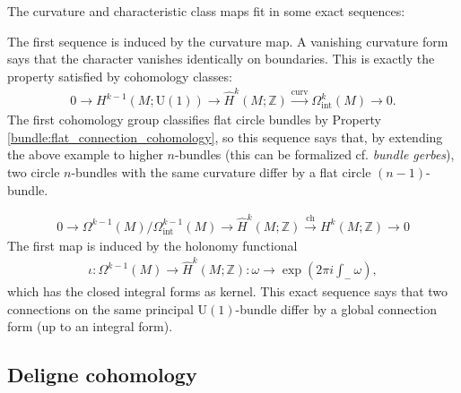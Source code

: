     The curvature and characteristic class maps fit in some exact sequences:
    \begin{property}
        The first sequence is induced by the curvature map. A vanishing curvature form says that the character vanishes identically on boundaries. This is exactly the property satisfied by cohomology classes:
        \begin{gather}
            0\longrightarrow H^{k-1}(M;\mathrm{U}(1))\longrightarrow\hat{H}^k(M;\mathbb{Z})\overset{\mathrm{curv}}{\longrightarrow}\Omega^k_\mathrm{int}(M)\longrightarrow0.
        \end{gather}
        The first cohomology group classifies flat circle bundles by Property \ref{bundle:flat_connection_cohomology}, so this sequence says that, by extending the above example to higher $n$-bundles (this can be formalized cf. \textit{bundle gerbes}), two circle $n$-bundles with the same curvature differ by a flat circle $(n-1)$-bundle.
    \end{property}
    \begin{property}
        \begin{gather}
            0\longrightarrow \Omega^{k-1}(M)/\Omega^{k-1}_\mathrm{int}(M)\longrightarrow\hat{H}^k(M;\mathbb{Z})\overset{\mathrm{ch}}{\longrightarrow} H^k(M;\mathbb{Z})\longrightarrow0
        \end{gather}
        The first map is induced by the holonomy functional
        \begin{gather}
            \iota:\Omega^{k-1}(M)\rightarrow\hat{H}^k(M;\mathbb{Z}):\omega\rightarrow\exp\left(2\pi i\int_-\omega\right),
        \end{gather}
        which has the closed integral forms as kernel. This exact sequence says that two connections on the same principal $\mathrm{U}(1)$-bundle differ by a global connection form (up to an integral form).
    \end{property}

\subsection{Deligne cohomology}

